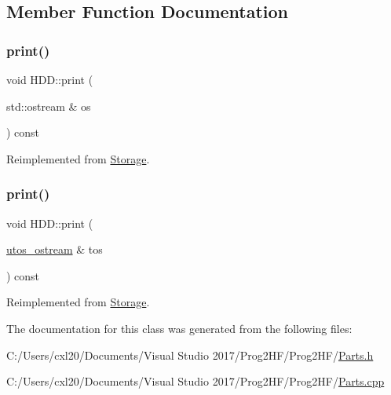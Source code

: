 \subsection{Member Function Documentation}
\mbox{\label{class_h_d_d_a07c34356018542934a4dd91ce38b0821}} 
\subsubsection{\texorpdfstring{print()}{print()}\hspace{0.1cm}{\footnotesize\ttfamily [1/2]}}
{\footnotesize\ttfamily void H\+D\+D\+::print (\begin{DoxyParamCaption}\item[{std\+::ostream \&}]{os }\end{DoxyParamCaption}) const\hspace{0.3cm}{\ttfamily [virtual]}}



Reimplemented from \mbox{\hyperlink{class_storage_aa9f6ffb0fd45839b54bd4e254270445d}{Storage}}.

\mbox{\label{class_h_d_d_aca2c2583fa3304917905cd9185b64539}} 
\subsubsection{\texorpdfstring{print()}{print()}\hspace{0.1cm}{\footnotesize\ttfamily [2/2]}}
{\footnotesize\ttfamily void H\+D\+D\+::print (\begin{DoxyParamCaption}\item[{\mbox{\hyperlink{structutos__ostream}{utos\+\_\+ostream}} \&}]{tos }\end{DoxyParamCaption}) const\hspace{0.3cm}{\ttfamily [virtual]}}



Reimplemented from \mbox{\hyperlink{class_storage_ab7ecf9e0777891b4e1a84bbf391a1cd4}{Storage}}.



The documentation for this class was generated from the following files\+:\begin{DoxyCompactItemize}
\item 
C\+:/\+Users/cxl20/\+Documents/\+Visual Studio 2017/\+Prog2\+H\+F/\+Prog2\+H\+F/\mbox{\hyperlink{_parts_8h}{Parts.\+h}}\item 
C\+:/\+Users/cxl20/\+Documents/\+Visual Studio 2017/\+Prog2\+H\+F/\+Prog2\+H\+F/\mbox{\hyperlink{_parts_8cpp}{Parts.\+cpp}}\end{DoxyCompactItemize}

